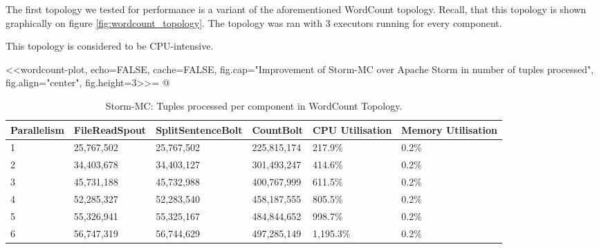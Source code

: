 The first topology we tested for performance is a variant of the aforementioned WordCount topology. Recall, that this topology is shown graphically on figure \ref{fig:wordcount_topology}. The topology was ran with 3 executors running for every component.

This topology is considered to be CPU-intensive.

<<wordcount-plot, echo=FALSE, cache=FALSE, fig.cap="Improvement of Storm-MC over Apache Storm in number of tuples processed", fig.align="center", fig.height=3>>=
@

\medskip
\begin{table}
\begin{adjustwidth}{-0.5in}{-0.5in}
\centering
\small
\begin{tabular}{@{}llllll@{}}
    {Parallelism} & {FileReadSpout} & {SplitSentenceBolt} & {CountBolt} & {CPU Utilisation} & {Memory Utilisation} \\ \toprule
    1 & {25,767,502} & {25,767,502} & {225,815,174} & {217.9\%} & {0.2\%} \\
    2 & {34,403,678} & {34,403,127} & {301,493,247} & {414.6\%} & {0.2\%} \\
    3 & {45,731,188} & {45,732,988} & {400,767,999} & {611.5\%} & {0.2\%} \\
    4 & {52,285,327} & {52,283,540} & {458,187,555} & {805.5\%} & {0.2\%} \\
	5 & {55,326,941} & {55,325,167} & {484,844,652} & {998.7\%} & {0.2\%} \\
	6 & {56,747,319} & {56,744,629} & {497,285,149} & {1,195.3\%} & {0.2\%} \\
\end{tabular}
\caption{Storm-MC: Tuples processed per component in WordCount Topology.}
\end{adjustwidth}
\label{table:storm_mcwordcount}
\end{table}
\medskip

